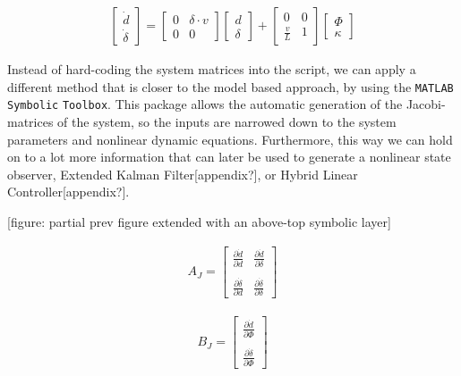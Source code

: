     \begin{align} \label{eq:of3}
        \begin{bmatrix}
               \dot{d} \\
               \dot{\delta}
        \end{bmatrix}
        =
        \begin{bmatrix}
               0 & \delta \cdot v \\
               0 & 0
        \end{bmatrix}
        \begin{bmatrix}
               d \\
               \delta
        \end{bmatrix}
		+
        \begin{bmatrix}
           0 & 0 \\
           \frac{v}{L} & 1
         \end{bmatrix}
         \begin{bmatrix}
               \Phi \\
               \kappa
        \end{bmatrix}
     \end{align}

Instead of hard-coding the system matrices into the script, we can apply a different method that is closer to the model based approach, by using the \verb!MATLAB! \verb!Symbolic! \verb!Toolbox!. This package allows the automatic generation of the Jacobi-matrices of the system, so the inputs are narrowed down to the system parameters and nonlinear dynamic equations. Furthermore, this way we can hold on to a lot more information that can later be used to generate a nonlinear state observer, Extended Kalman Filter[appendix?], or Hybrid Linear Controller[appendix?].

[figure: partial prev figure extended with an above-top symbolic layer]
     
\begin{minipage}{0.45\linewidth}
    \begin{align}
        A_J =
        \begin{bmatrix}
           \frac{\partial \dot{d}}{\partial d} & \frac{\partial \dot{d}}{\partial \delta} \\
           & \\
           \frac{\partial \dot{\delta}}{\partial d} & \frac{\partial \dot{\delta}}{\partial \delta}
         \end{bmatrix}
     \end{align}
\end{minipage}
\begin{minipage}{0.45\linewidth}
    \begin{align}
        B_J =
         \begin{bmatrix}
               \frac{\partial \dot{d}}{\partial \Phi} \\
               \\
               \frac{\partial \dot{\delta}}{\partial \Phi}
        \end{bmatrix}
     \end{align}
\end{minipage}

